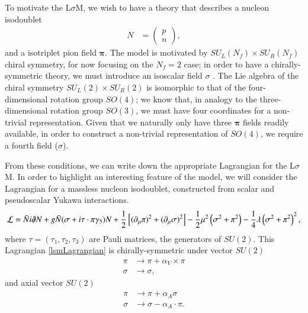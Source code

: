 \documentclass[aps,prd,onecolumn,showpacs,amsmath,amssymb,nofootinbib]{revtex4} \pdfoutput=1
\newcommand{\lsm}{L$\sigma$M}
\newcommand{\groupsu}[1]{S\!U(#1)}
\begin{document}
To motivate the \lsm, we wish to have a theory that describes a nucleon isodoublet 
\begin{align}
    N &= 
        \begin{pmatrix}
          p \\
          n
        \end{pmatrix},
  \end{align}
  and a isotriplet pion field $\mathbf{\pi}$. The model is motivated by ${S\!U}_L(N_f)\times {S\!U}_R(N_f)$ chiral symmetry, for now focusing on the $N_f = 2$ case; in order to have a chirally-symmetric theory, we must introduce an isoscalar field $\sigma$ \cite{Epelbaum2010}. The Lie algebra of the chiral symmetry ${S\!U}_L(2)\times {S\!U}_R(2)$ is isomorphic to that of the four-dimensional rotation group $S\!O(4)$; we know that, in analogy to the three-dimensional rotation group $S\!O(3)$, we must have four coordinates for a non-trivial representation. Given that we naturally only have three $\mathbf{\pi}$ fields readily available, in order to construct a non-trivial representation of $S\!O(4)$, we require a fourth field ($\sigma$).
  
  From these conditions, we can write down the appropriate Lagrangian for the \lsm. In order to highlight an interesting feature of the model, we will consider the Lagrangian for a massless nucleon isodoublet, constructed from scalar and pseudoscalar Yukawa interactions. 
  \begin{equation}
      \label{lsmLagrangian}
      \mathcal{L} = \bar{N}i \slashed{\partial}N + g\bar{N}(\sigma + i \mathbf{\tau \cdot \pi}\gamma_{5})N +\frac{1}{2}\left[(\partial_{\mu}\mathbf{\pi})^{2}+(\partial_{\mu}\mathbf{\sigma})^{2}\right]-\frac{1}{2}\mu^2\left(\sigma^2+\mathbf{\pi}^2\right) - \frac{1}{4}\lambda\left(\sigma^2+\mathbf{\pi}^2\right)^2,
  \end{equation}
  where $\tau = (\tau_1, \tau_2, \tau_3)$ are Pauli matrices, the generators of $\groupsu{2}$.
  This Lagrangian \eqref{lsmLagrangian} is chirally-symmetric under vector $\groupsu{2}$
  \begin{align}
  \label{lsm-vectortransformations}
      \pi  & \rightarrow \pi + \alpha_V \times \pi\\
      \sigma & \rightarrow \sigma,
  \end{align}
  and axial vector $\groupsu{2}$
  \begin{align}
    \label{lsm-axialvectortransformation}
      \pi  & \rightarrow \pi + \alpha_A \sigma\\
      \sigma & \rightarrow \sigma-\alpha_A \cdot \pi.
  \end{align}
  
\end{document}
